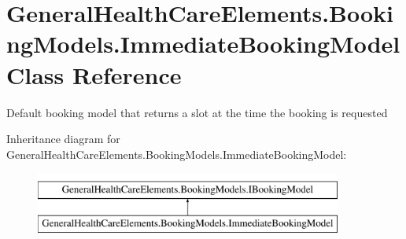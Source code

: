 \hypertarget{class_general_health_care_elements_1_1_booking_models_1_1_immediate_booking_model}{}\section{General\+Health\+Care\+Elements.\+Booking\+Models.\+Immediate\+Booking\+Model Class Reference}
\label{class_general_health_care_elements_1_1_booking_models_1_1_immediate_booking_model}


Default booking model that returns a slot at the time the booking is requested  


Inheritance diagram for General\+Health\+Care\+Elements.\+Booking\+Models.\+Immediate\+Booking\+Model\+:\begin{figure}[H]
\begin{center}
\leavevmode
\includegraphics[height=2.000000cm]{class_general_health_care_elements_1_1_booking_models_1_1_immediate_booking_model}
\end{center}
\end{figure}

